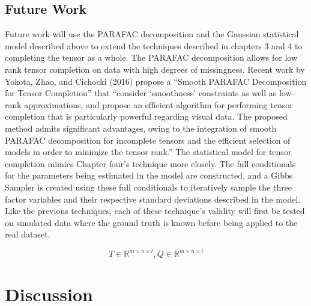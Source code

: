 \documentclass[12pt,twoside]{dukestatscithesis}
\theoremstyle{definition}
\theoremstyle{definition}
\theoremstyle{definition}
\theoremstyle{remark}
\begin{document}
\section{Future Work}\label{future-work}

Future work will use the PARAFAC decomposition and the Gaussian
statistical model described above to extend the techniques described in
chapters 3 and 4 to completing the tensor as a whole. The PARAFAC
decomposition allows for low rank tensor completion on data with high
degrees of missingness. Recent work by Yokota, Zhao, and Cichocki (2016)
propose a ``Smooth PARAFAC Decomposition for Tensor Completion'' that
``consider `smoothness' constraints as well as low-rank approximations,
and propose an efficient algorithm for performing tensor completion that
is particularly powerful regarding visual data. The proposed method
admits significant advantages, owing to the integration of smooth
PARAFAC decomposition for incomplete tensors and the efficient selection
of models in order to minimize the tensor rank.'' The statistical model
for tensor completion mimics Chapter four's technique more closely. The
full conditionals for the parameters being estimated in the model are
constructed, and a Gibbs Sampler is created using these full
conditionals to iteratively sample the three factor variables and their
respective standard deviations described in the model. Like the previous
techniques, each of these technique's validity will first be tested on
simulated data where the ground truth is known before being applied to
the real dataset.

\[T \in \mathbb{R}^{m \times n \times l}, Q \in \mathbb{R}^{m \times n \times l}\]

\chapter*{Discussion}\label{discussion}
\end{document}
